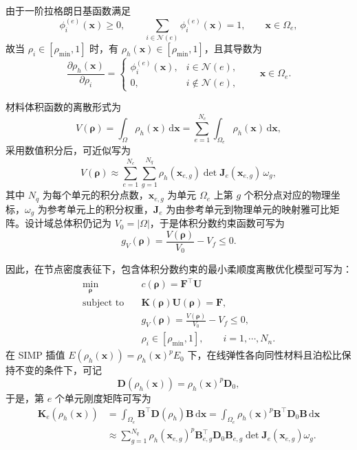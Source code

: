 由于一阶拉格朗日基函数满足
\[
\phi_i^{(e)}(\boldsymbol{x})\ge 0,\qquad \sum_{i\in\mathcal N(e)}\phi_i^{(e)}(\boldsymbol{x})=1, \qquad \boldsymbol{x}\in\Omega_e,
\]
故当 $\rho_i\in[\rho_{\min},1]$ 时，有 $\rho_h(\boldsymbol{x})\in[\rho_{\min},1]$，且其导数为
\[
\frac{\partial \rho_h(\boldsymbol{x})}{\partial \rho_i} = \begin{cases} \phi_i^{(e)}(\boldsymbol{x}), & i\in\mathcal N(e),\\[4pt] 0, & i\notin\mathcal N(e), \end{cases} \qquad \boldsymbol{x}\in\Omega_e.
\]

材料体积函数的离散形式为
\[
V(\boldsymbol{\rho}) = \int_{\Omega}\rho_h(\boldsymbol{x})\,\mathrm d\boldsymbol{x} = \sum_{e=1}^{N_c}\int_{\Omega_e}\rho_h(\boldsymbol{x})\,\mathrm d\boldsymbol{x},
\]
采用数值积分后，可近似写为
\[
V(\boldsymbol{\rho}) \approx \sum_{e=1}^{N_c}\sum_{g=1}^{N_q} \rho_h(\boldsymbol{x}_{e,g}) \det\boldsymbol J_e(\boldsymbol{x}_{e,g})\,\omega_g,
\]
其中 $N_q$ 为每个单元的积分点数，$\boldsymbol{x}_{e,g}$ 为单元 $\Omega_e$ 上第 $g$ 个积分点对应的物理坐标，$\omega_g$ 为参考单元上的积分权重，$\boldsymbol J_e$ 为由参考单元到物理单元的映射雅可比矩阵。设计域总体积仍记为 $V_0=|\Omega|$，于是体积分数约束函数可写为
\[
g_V(\boldsymbol{\rho}) = \frac{V(\boldsymbol{\rho})}{V_0}-V_f\le 0.
\]

因此，在节点密度表征下，包含体积分数约束的最小柔顺度离散优化模型可写为：
\begin{equation} \label{eq:ch3_discrete_model_node}
	\begin{aligned} 
		\min_{\boldsymbol{\rho}}\quad & c(\boldsymbol{\rho}) = \boldsymbol{F}^{\top}\boldsymbol{U}\\ 
		\text{subject to}\quad & \boldsymbol{K}(\boldsymbol\rho)\boldsymbol{U}(\boldsymbol\rho)=\boldsymbol{F},\\ 
		& g_V(\boldsymbol\rho)=\frac{V(\boldsymbol\rho)}{V_0}-V_f\le 0,\\ 
		& \rho_i\in[\rho_{\min},1],\qquad i=1,\cdots,N_n. 
	\end{aligned}
\end{equation}
在 SIMP 插值 $E(\rho_h(\boldsymbol{x}))=\rho_h(\boldsymbol{x})^pE_0$ 下，在线弹性各向同性材料且泊松比保持不变的条件下，可记
\[
\boldsymbol D(\rho_h(\boldsymbol{x})) = \rho_h(\boldsymbol{x})^p\boldsymbol D_0,
\]
于是，第 $e$ 个单元刚度矩阵可写为
\[
\begin{aligned}
	\boldsymbol{K}_e(\rho_h(\boldsymbol{x})) 
	&= \int_{\Omega_e}\boldsymbol{B}^{\top}\boldsymbol{D}(\rho_h)\boldsymbol{B}\,\mathrm{d}\boldsymbol{x} = \int_{\Omega_e}\rho_h(\boldsymbol x)^p\boldsymbol B^{\top}\boldsymbol D_0\boldsymbol B\,\mathrm d\boldsymbol x\\
	&\approx \sum_{g=1}^{N_q}\rho_h(\boldsymbol{x}_{e,g})^p\boldsymbol{B}_{e,g}^{\top}\boldsymbol{D}_0\boldsymbol{B}_{e,g}\det\boldsymbol{J}_e(\boldsymbol{x}_{e,g})\omega_g.
\end{aligned}
\]

